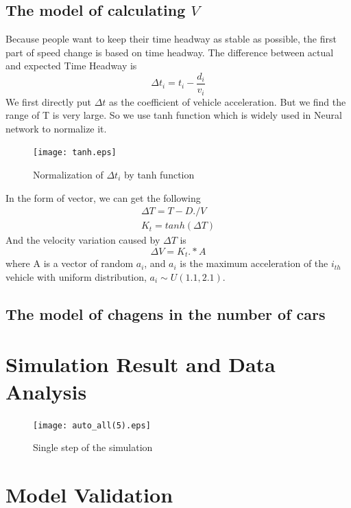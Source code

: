\documentclass{mcmthesis}
\begin{document}
\subsection{The model of calculating $V$}
\label{velocity change}
Because people want to keep their time headway as stable as possible, the first part of speed change is based on time headway. The difference between actual and expected Time Headway is
\begin{equation}
	\Delta t_{i}=t_{i}-\frac{d_{i}}{v_{i}}
\end{equation}
\indent We first directly put $\Delta t$ as the coefficient of vehicle acceleration. But we find the range of T is very large. So we use tanh function which is widely used in Neural network to normalize it.\\
\begin{figure}[H]
	\centerline{\texttt{[image: tanh.eps]}}
	\caption{Normalization of $\Delta t_{i}$ by tanh function}
\end{figure}
\indent In the form of vector, we can get the following
\begin{equation}
\begin{split}
	\Delta T=T-D./V\\
	K_{t}= tanh(\Delta T) 
\end{split}
\end{equation}
\indent And the velocity variation caused by $\Delta T$ is
\begin{equation}
	\Delta V=K_{t}.*A
\end{equation}
where A is a vector of random $a_{i}$, and $a_{i}$ is the maximum acceleration of the $i_{th}$ vehicle with uniform distribution, $a_{i}\sim U(1.1,2.1)$.
\subsection{The model of chagens in the number of cars}
\label{changes of cars}
 
\section{Simulation Result and Data Analysis}
\begin{figure}[H]
	\centerline{\texttt{[image: auto\_all(5).eps]}}
	\caption{Single step of the simulation}
\end{figure}
\section{Model Validation}
\end{document}
